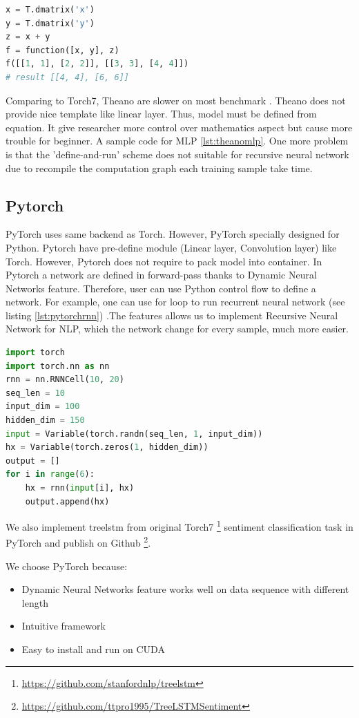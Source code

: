 \begin{lstlisting}[caption={Define function in Theano},label={lst:theanof}, language={python}]
x = T.dmatrix('x')
y = T.dmatrix('y')
z = x + y
f = function([x, y], z)
f([[1, 1], [2, 2]], [[3, 3], [4, 4]])
# result [[4, 4], [6, 6]]
\end{lstlisting}

Comparing to Torch7, Theano are slower on most benchmark \cite{collobert2011torch7}. Theano does not provide nice template like linear layer. Thus, model must be defined from equation. It give researcher more control over mathematics aspect but cause more trouble for beginner. A sample code for MLP \ref{lst:theanomlp}. One more problem is that the 'define-and-run' scheme does not suitable for recursive neural network due to recompile the computation graph each training sample take time.

\subsection{Pytorch}\label{sec:pytorch}
PyTorch uses same backend as Torch. However, PyTorch specially designed for Python. Pytorch have pre-define module (Linear layer, Convolution layer) like Torch. However, Pytorch does not require to pack model into container. In Pytorch a network are defined in forward-pass thanks to Dynamic Neural Networks feature. Therefore, user can use Python control flow to define a network. For example, one can use for loop to run recurrent neural network (see listing \ref{lst:pytorchrnn}) .The features allows us to implement Recursive Neural Network for NLP, which the network change for every sample, much more easier. 

\begin{lstlisting}[caption={RNN},label={lst:pytorchrnn}, language={python}]
import torch
import torch.nn as nn
rnn = nn.RNNCell(10, 20)
seq_len = 10
input_dim = 100
hidden_dim = 150
input = Variable(torch.randn(seq_len, 1, input_dim))
hx = Variable(torch.zeros(1, hidden_dim))
output = []
for i in range(6):
    hx = rnn(input[i], hx)
    output.append(hx)
\end{lstlisting}

We also implement treelstm from original Torch7 \footnote{\url{https://github.com/stanfordnlp/treelstm}} sentiment classification task in PyTorch and publish on Github \footnote{\url{https://github.com/ttpro1995/TreeLSTMSentiment}}.

We choose PyTorch because:
\begin{itemize}
	\item Dynamic Neural Networks feature works well on data sequence with different length
	\item Intuitive framework
	\item Easy to install and run on CUDA
\end{itemize}
